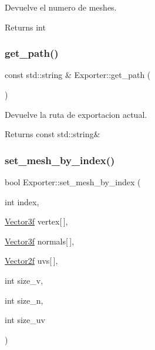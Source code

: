 Devuelve el numero de meshes. 

\begin{DoxyReturn}{Returns}
int 
\end{DoxyReturn}
\mbox{\label{class_exporter_a2e2191962453067d9b6befbc4b6842d1}} 
\subsubsection{\texorpdfstring{get\_path()}{get\_path()}}
{\footnotesize\ttfamily const std\+::string \& Exporter\+::get\+\_\+path (\begin{DoxyParamCaption}{ }\end{DoxyParamCaption})}



Devuelve la ruta de exportacion actual. 

\begin{DoxyReturn}{Returns}
const std\+::string\& 
\end{DoxyReturn}
\mbox{\label{class_exporter_aefd37f252280f8c4aa8942aad3295bf2}} 
\subsubsection{\texorpdfstring{set\_mesh\_by\_index()}{set\_mesh\_by\_index()}}
{\footnotesize\ttfamily bool Exporter\+::set\+\_\+mesh\+\_\+by\+\_\+index (\begin{DoxyParamCaption}\item[{int}]{index,  }\item[{\mbox{\hyperlink{structmathexp_1_1_vector3f}{Vector3f}}}]{vertex\mbox{[}$\,$\mbox{]},  }\item[{\mbox{\hyperlink{structmathexp_1_1_vector3f}{Vector3f}}}]{normals\mbox{[}$\,$\mbox{]},  }\item[{\mbox{\hyperlink{structmathexp_1_1_vector2f}{Vector2f}}}]{uvs\mbox{[}$\,$\mbox{]},  }\item[{int}]{size\+\_\+v,  }\item[{int}]{size\+\_\+n,  }\item[{int}]{size\+\_\+uv }\end{DoxyParamCaption})}



